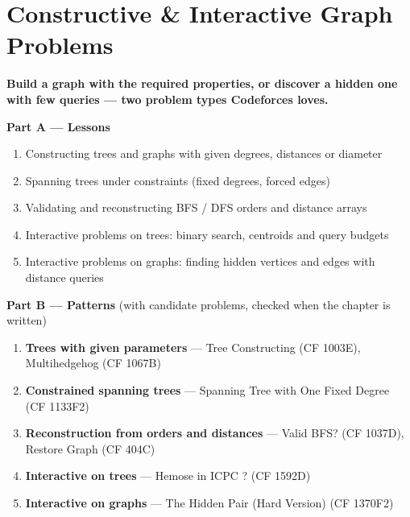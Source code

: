 \chapter{Constructive \& Interactive Graph Problems}
\label{ch:constructive}

\begin{tcolorbox}[enhanced, colback=white, colframe=secondaryblue, boxrule=1pt, arc=2mm]
\textbf{\large\textcolor{primaryblue}{Build a graph with the required properties, or discover a hidden one with few queries --- two problem types Codeforces loves.}}
\end{tcolorbox}


\begin{plannedbox}
\textbf{Part A --- Lessons}
\begin{enumerate}[leftmargin=*, label=\textbf{A\arabic*.}, itemsep=1pt]
    \item Constructing trees and graphs with given degrees, distances or diameter
    \item Spanning trees under constraints (fixed degrees, forced edges)
    \item Validating and reconstructing BFS / DFS orders and distance arrays
    \item Interactive problems on trees: binary search, centroids and query budgets
    \item Interactive problems on graphs: finding hidden vertices and edges with distance queries
\end{enumerate}
\textbf{Part B --- Patterns} (with candidate problems, checked when the chapter is written)
\begin{enumerate}[leftmargin=*, label=\textbf{P\arabic*.}, itemsep=1pt]
    \item \textbf{Trees with given parameters} --- Tree Constructing {\small\color{darkgray}(CF 1003E)}, Multihedgehog {\small\color{darkgray}(CF 1067B)}
    \item \textbf{Constrained spanning trees} --- Spanning Tree with One Fixed Degree {\small\color{darkgray}(CF 1133F2)}
    \item \textbf{Reconstruction from orders and distances} --- Valid BFS? {\small\color{darkgray}(CF 1037D)}, Restore Graph {\small\color{darkgray}(CF 404C)}
    \item \textbf{Interactive on trees} --- Hemose in ICPC ? {\small\color{darkgray}(CF 1592D)}
    \item \textbf{Interactive on graphs} --- The Hidden Pair (Hard Version) {\small\color{darkgray}(CF 1370F2)}
\end{enumerate}
\end{plannedbox}
